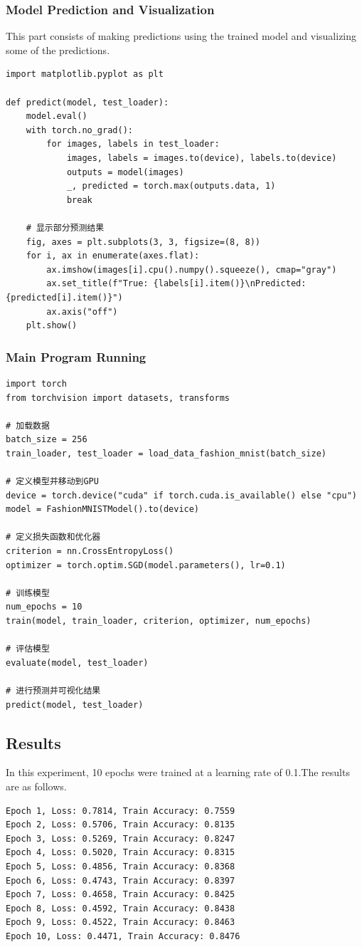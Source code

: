 \documentclass[a4paper,12pt]{article}
\begin{document}
\subsubsection{Model Prediction and Visualization}
This part consists of making predictions using the trained model and visualizing some of the predictions.
\begin{lstlisting}
import matplotlib.pyplot as plt

def predict(model, test_loader):
    model.eval()
    with torch.no_grad():
        for images, labels in test_loader:
            images, labels = images.to(device), labels.to(device)
            outputs = model(images)
            _, predicted = torch.max(outputs.data, 1)
            break

    # 显示部分预测结果
    fig, axes = plt.subplots(3, 3, figsize=(8, 8))
    for i, ax in enumerate(axes.flat):
        ax.imshow(images[i].cpu().numpy().squeeze(), cmap="gray")
        ax.set_title(f"True: {labels[i].item()}\nPredicted: {predicted[i].item()}")
        ax.axis("off")
    plt.show()
\end{lstlisting}

\subsubsection{Main Program Running}
\begin{lstlisting}
import torch
from torchvision import datasets, transforms

# 加载数据
batch_size = 256
train_loader, test_loader = load_data_fashion_mnist(batch_size)

# 定义模型并移动到GPU
device = torch.device("cuda" if torch.cuda.is_available() else "cpu")
model = FashionMNISTModel().to(device)

# 定义损失函数和优化器
criterion = nn.CrossEntropyLoss()
optimizer = torch.optim.SGD(model.parameters(), lr=0.1)

# 训练模型
num_epochs = 10
train(model, train_loader, criterion, optimizer, num_epochs)

# 评估模型
evaluate(model, test_loader)

# 进行预测并可视化结果
predict(model, test_loader)
\end{lstlisting}

\subsection{Results}
In this experiment, 10 epochs were trained at a learning rate of 0.1.The results are as follows.
\begin{lstlisting}
Epoch 1, Loss: 0.7814, Train Accuracy: 0.7559
Epoch 2, Loss: 0.5706, Train Accuracy: 0.8135
Epoch 3, Loss: 0.5269, Train Accuracy: 0.8247
Epoch 4, Loss: 0.5020, Train Accuracy: 0.8315
Epoch 5, Loss: 0.4856, Train Accuracy: 0.8368
Epoch 6, Loss: 0.4743, Train Accuracy: 0.8397
Epoch 7, Loss: 0.4658, Train Accuracy: 0.8425
Epoch 8, Loss: 0.4592, Train Accuracy: 0.8438
Epoch 9, Loss: 0.4522, Train Accuracy: 0.8463
Epoch 10, Loss: 0.4471, Train Accuracy: 0.8476
\end{lstlisting}
\end{document}
